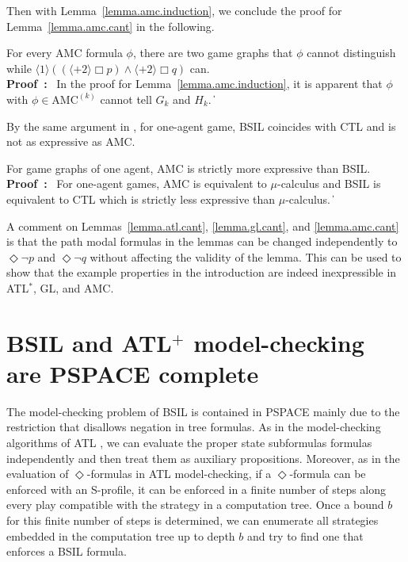 \documentclass[11pt]{article}
\newcommand{\pf}{\noindent\mbox{\bf Proof : }}
\newcommand{\pfrr}{\Box}
\newcommand{\pevt}{\Diamond}
\def\qed{\ifmmode\|\else{\unskip\nobreak\hfil
\penalty50\hskip1em\null\nobreak\hfil$\blacksquare$
\parfillskip=0pt\finalhyphendemerits=0\endgraf}\fi}
\begin{document}
Then with Lemma~\ref{lemma.amc.induction}, 
we conclude the proof for Lemma~\ref{lemma.amc.cant} in the following. 


{\lemma \label{lemma.amc.cant}
For every AMC formula $\phi$,
there are two game graphs that
$\phi$ cannot distinguish while
$\langle 1\rangle ((\langle+ 2\rangle\pfrr p)
    \wedge \langle+ 2\rangle\pfrr q)$ can.
}
\\\pf 
In the proof for Lemma~\ref{lemma.amc.induction}, 
it is apparent that $\phi$ with $\phi\in\mbox{AMC}^{(k)}$ cannot 
tell $G_k$ and $H_k$.  
\qed 

By the same argument in \cite{AHK02}, 
for one-agent game, BSIL coincides with CTL and is not as expressive as 
AMC. 

{\lemma \label{lemma.amc.can}
For game graphs of one agent,
AMC is strictly more expressive than BSIL.} 
\\\pf 
For one-agent games, 
AMC is equivalent to $\mu$-calculus and BSIL is equivalent to CTL which
is strictly less expressive than $\mu$-calculus.
\qed 



A comment on Lemmas~\ref{lemma.atl.cant}, 
\ref{lemma.gl.cant}, and \ref{lemma.amc.cant} 
is that the path modal formulas in the lemmas can be changed 
independently to $\pevt \neg p$ and $\pevt \neg q$ without affecting the validity of 
the lemma.  
This can be used to show that the example properties in the introduction 
are indeed inexpressible in ATL$^*$, GL, and AMC.  




\section{BSIL and ATL$^+$ model-checking are PSPACE complete 
\label{sec.mck.psp}}





The model-checking problem of BSIL is contained in 
PSPACE mainly due to the restriction that disallows 
negation in tree formulas.
As in the model-checking algorithms 
of ATL \cite{AHK02}, we can evaluate the proper state subformulas  
formulas independently and then treat them as auxiliary propositions.  
Moreover, as in the evaluation of $\pevt$-formulas in 
ATL model-checking, 
if a $\pevt$-formula can be enforced with an S-profile, it can be enforced 
in a finite number of steps along every play compatible with 
the strategy in a computation tree.  
Once a bound $b$ for this finite number of steps is determined, 
we can enumerate all strategies embedded in the computation 
tree up to depth $b$ and try to find one that enforces a BSIL formula.  
\end{document}
